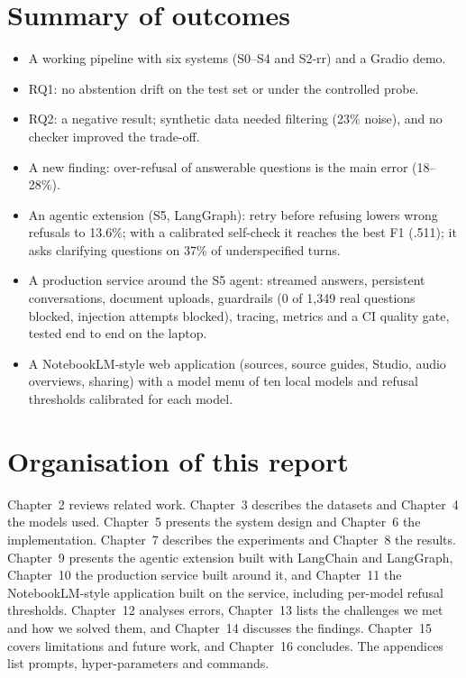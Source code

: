 \documentclass[11pt,a4paper]{report}
\newcommand{\sys}[1]{\textsf{#1}}
\begin{document}
\section{Summary of outcomes}
\begin{itemize}
\item A working pipeline with six systems (\sys{S0}--\sys{S4} and \sys{S2-rr}) and a Gradio demo.
\item RQ1: no abstention drift on the test set or under the controlled probe.
\item RQ2: a negative result; synthetic data needed filtering (23\% noise), and no checker improved the trade-off.
\item A new finding: over-refusal of answerable questions is the main error (18--28\%).
\item An agentic extension (S5, LangGraph): retry before refusing lowers wrong refusals to 13.6\%; with a calibrated self-check it reaches the best F1 (.511); it asks clarifying questions on 37\% of underspecified turns.
\item A production service around the S5 agent: streamed answers, persistent conversations, document uploads, guardrails (0 of 1{,}349 real questions blocked, injection attempts blocked), tracing, metrics and a CI quality gate, tested end to end on the laptop.
\item A NotebookLM-style web application (sources, source guides, Studio, audio overviews, sharing) with a model menu of ten local models and refusal thresholds calibrated for each model.
\end{itemize}

\section{Organisation of this report}
Chapter~2 reviews related work. Chapter~3 describes the datasets and Chapter~4 the models used. Chapter~5 presents the system design and Chapter~6 the implementation. Chapter~7 describes the experiments and Chapter~8 the results. Chapter~9 presents the agentic extension built with LangChain and LangGraph, Chapter~10 the production service built around it, and Chapter~11 the NotebookLM-style application built on the service, including per-model refusal thresholds. Chapter~12 analyses errors, Chapter~13 lists the challenges we met and how we solved them, and Chapter~14 discusses the findings. Chapter~15 covers limitations and future work, and Chapter~16 concludes. The appendices list prompts, hyper-parameters and commands.
\end{document}
